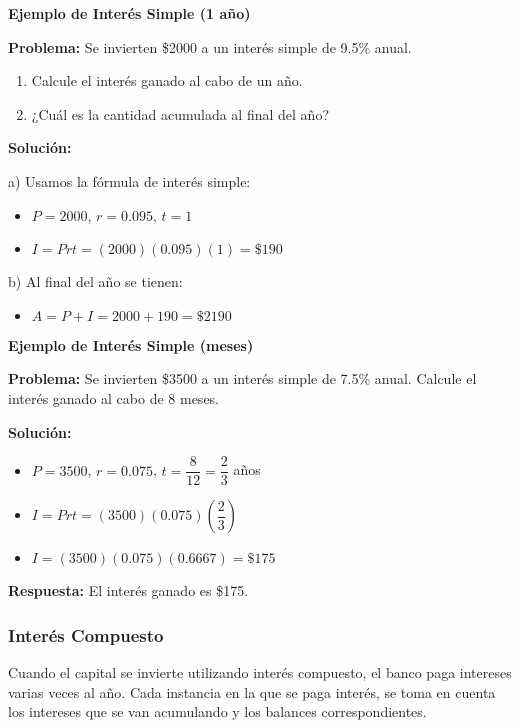 \begin{example}
\textbf{Ejemplo de Interés Simple (1 año)}

\textbf{Problema:} Se invierten \$2000 a un interés simple de 9.5\% anual.
\begin{enumerate}[label=\alph*)]
    \item Calcule el interés ganado al cabo de un año.
    \item ¿Cuál es la cantidad acumulada al final del año?
\end{enumerate}

\textbf{Solución:}

a) Usamos la fórmula de interés simple:
\begin{itemize}
    \item $P = 2000$, $r = 0.095$, $t = 1$
    \item $I = Prt = (2000)(0.095)(1) = \$190$
\end{itemize}

b) Al final del año se tienen:
\begin{itemize}
    \item $A = P + I = 2000 + 190 = \$2190$
\end{itemize}
\end{example}

\begin{example}
\textbf{Ejemplo de Interés Simple (meses)}

\textbf{Problema:} Se invierten \$3500 a un interés simple de 7.5\% anual. Calcule el interés ganado al cabo de 8 meses.

\textbf{Solución:}
\begin{itemize}
    \item $P = 3500$, $r = 0.075$, $t = \dfrac{8}{12} = \dfrac{2}{3}$ años
    \item $I = Prt = (3500)(0.075)\left(\dfrac{2}{3}\right)$
    \item $I = (3500)(0.075)(0.6667) = \$175$
\end{itemize}

\textbf{Respuesta:} El interés ganado es \$175.
\end{example}

\newpage
\subsubsection*{Interés Compuesto}

Cuando el capital se invierte utilizando interés compuesto, el banco paga intereses varias veces al año. Cada instancia en la que se paga interés, se toma en cuenta los intereses que se van acumulando y los balances correspondientes.

